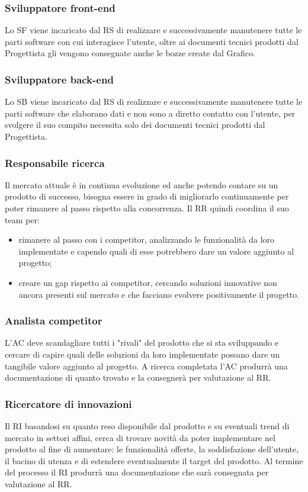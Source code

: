 \subsubsection{Sviluppatore front-end}
Lo SF viene incaricato dal RS di realizzare e successivamente manutenere tutte le parti
software con cui interagisce l\textquoteright{}utente, oltre ai documenti tecnici prodotti dal Progettista
gli vengono consegnate anche le bozze create dal Grafico.

\subsubsection{Sviluppatore back-end}
Lo SB viene incaricato dal RS di realizzare e successivamente manutenere tutte le parti
software che elaborano dati e non sono a diretto contatto con l\textquoteright{}utente, per svolgere il
suo compito necessita solo dei documenti tecnici prodotti dal Progettista.

\subsubsection{Responsabile ricerca}
Il mercato attuale \`{e} in continua evoluzione ed anche potendo contare su un prodotto
di successo, bisogna essere in grado di migliorarlo continuamente per poter rimanere al
passo rispetto alla concorrenza. Il RR quindi coordina il suo team per:
\begin{itemize}
\item rimanere al passo con i competitor, analizzando le funzionalit\`{a} da loro
implementate e capendo quali di esse potrebbero dare un valore aggiunto al
progetto;
\item creare un gap rispetto ai competitor, cercando soluzioni innovative non ancora
presenti sul mercato e che facciano evolvere positivamente il progetto.
\end{itemize}

\subsubsection{Analista competitor}
L\textquoteright{}AC deve scandagliare tutti i "rivali" del prodotto che si sta sviluppando e cercare
di capire quali delle soluzioni da loro implementate possano dare un tangibile valore
aggiunto al progetto. A ricerca completata l\textquoteright{}AC produrr\`{a} una documentazione di quanto
trovato e la consegner\`{a} per valutazione al RR.

\subsubsection{Ricercatore di innovazioni}
Il RI basandosi su quanto reso disponibile dal prodotto e su eventuali trend di mercato
in settori affini, cerca di trovare novit\`{a} da poter implementare nel prodotto al fine di
aumentare: le funzionalit\`{a} offerte, la soddisfazione dell\textquoteright{}utente, il bacino di utenza e di
estendere eventualmente il target del prodotto. Al termine del processo il RI produrr\`{a}
una documentazione che sar\`{a} consegnata per valutazione al RR.

